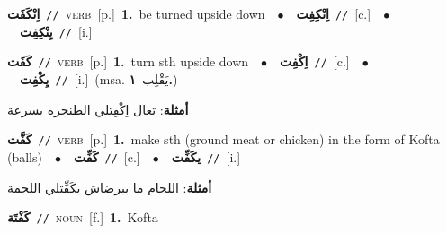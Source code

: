 \documentclass[10pt,a4paper,twoside]{article} %
\begin{document}
\begin{multicols}{2}
{\setlength\topsep{0pt}\textbf{\foreignlanguage{arabic}{اِنْكَفَت}}\ {\color{gray}\texttt{//}\color{black}}\ \textsc{verb}\ [p.]\ \textbf{1.}~be turned upside down\ \ $\bullet$\ \ \setlength\topsep{0pt}\textbf{\foreignlanguage{arabic}{اِنْكِفِت}}\ {\color{gray}\texttt{//}\color{black}}\ [c.]\ \ $\bullet$\ \ \setlength\topsep{0pt}\textbf{\foreignlanguage{arabic}{يِنْكِفِت}}\ {\color{gray}\texttt{//}\color{black}}\ [i.]\ } \vspace{2mm}

{\setlength\topsep{0pt}\textbf{\foreignlanguage{arabic}{كَفَت}}\ {\color{gray}\texttt{//}\color{black}}\ \textsc{verb}\ [p.]\ \textbf{1.}~turn sth upside down\ \ $\bullet$\ \ \setlength\topsep{0pt}\textbf{\foreignlanguage{arabic}{اِكْفِت}}\ {\color{gray}\texttt{//}\color{black}}\ [c.]\ \ $\bullet$\ \ \setlength\topsep{0pt}\textbf{\foreignlanguage{arabic}{يِكْفِت}}\ {\color{gray}\texttt{//}\color{black}}\ [i.]\ \color{gray}(msa. \foreignlanguage{arabic}{يَقْلِب}~\foreignlanguage{arabic}{\textbf{١.}})\color{black}\  \begin{flushright}\color{gray}\foreignlanguage{arabic}{\textbf{\underline{\foreignlanguage{arabic}{أمثلة}}}: تعال اِكْفِتلي الطنجرة بسرعة}\end{flushright}\color{black}} \vspace{2mm}

{\setlength\topsep{0pt}\textbf{\foreignlanguage{arabic}{كَفَّت}}\ {\color{gray}\texttt{//}\color{black}}\ \textsc{verb}\ [p.]\ \textbf{1.}~make sth (ground meat or chicken) in the form of Kofta (balls)\ \ $\bullet$\ \ \setlength\topsep{0pt}\textbf{\foreignlanguage{arabic}{كَفِّت}}\ {\color{gray}\texttt{//}\color{black}}\ [c.]\ \ $\bullet$\ \ \setlength\topsep{0pt}\textbf{\foreignlanguage{arabic}{يكَفِّت}}\ {\color{gray}\texttt{//}\color{black}}\ [i.]\  \begin{flushright}\color{gray}\foreignlanguage{arabic}{\textbf{\underline{\foreignlanguage{arabic}{أمثلة}}}: اللحام ما بيرضاش يكَفِّتلي اللحمة}\end{flushright}\color{black}} \vspace{2mm}

{\setlength\topsep{0pt}\textbf{\foreignlanguage{arabic}{كَفْتَة}}\ {\color{gray}\texttt{//}\color{black}}\ \textsc{noun}\ [f.]\ \textbf{1.}~Kofta\ } \vspace{2mm}


\end{multicols}
\end{document}
